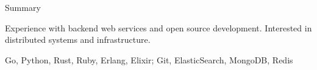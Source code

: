 \documentclass{resume} %
\begin{document}

\begin{rSection}{Summary}
  \begin{rSummarySection}
  {
    \item Experience with backend web services and open source development. Interested in distributed systems and infrastructure.
    \item Go, Python, Rust, Ruby, Erlang, Elixir; Git, ElasticSearch, MongoDB, Redis
  }
  \end{rSummarySection}
\end{rSection}

\end{document}
